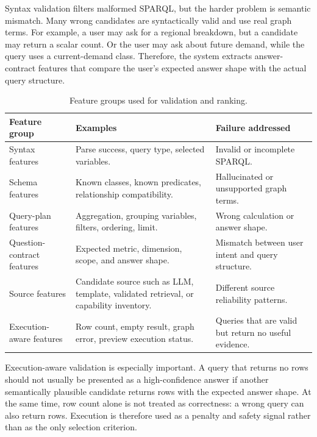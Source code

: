 \documentclass[
  12pt,
  english,
  oneside]{report}
\begin{document}
Syntax validation filters malformed SPARQL, but the harder problem is semantic mismatch. Many wrong candidates are syntactically valid and use real graph terms. For example, a user may ask for a regional breakdown, but a candidate may return a scalar count. Or the user may ask about future demand, while the query uses a current-demand class. Therefore, the system extracts answer-contract features that compare the user's expected answer shape with the actual query structure.

\begin{table}[htbp]
\centering
\caption{Feature groups used for validation and ranking.}
\label{tab:feature-groups}
\small
\begin{tabularx}{\textwidth}{
>{\raggedright\arraybackslash}p{3.8cm}
>{\raggedright\arraybackslash}p{4.8cm}
>{\raggedright\arraybackslash}X
}
\toprule
\textbf{Feature group} & \textbf{Examples} & \textbf{Failure addressed} \\
\midrule
Syntax features & Parse success, query type, selected variables. & Invalid or incomplete SPARQL. \\
Schema features & Known classes, known predicates, relationship compatibility. & Hallucinated or unsupported graph terms. \\
Query-plan features & Aggregation, grouping variables, filters, ordering, limit. & Wrong calculation or answer shape. \\
Question-contract features & Expected metric, dimension, scope, and answer shape. & Mismatch between user intent and query structure. \\
Source features & Candidate source such as LLM, template, validated retrieval, or capability inventory. & Different source reliability patterns. \\
Execution-aware features & Row count, empty result, graph error, preview execution status. & Queries that are valid but return no useful evidence. \\
\bottomrule
\end{tabularx}
\end{table}

Execution-aware validation is especially important. A query that returns no rows should not usually be presented as a high-confidence answer if another semantically plausible candidate returns rows with the expected answer shape. At the same time, row count alone is not treated as correctness: a wrong query can also return rows. Execution is therefore used as a penalty and safety signal rather than as the only selection criterion.
\end{document}
